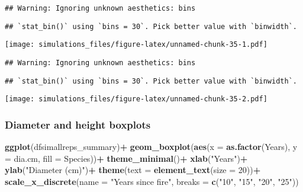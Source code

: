 \documentclass[]{article}
\newenvironment{Shaded}{\begin{snugshade}}{\end{snugshade}}
\newcommand{\KeywordTok}[1]{\textcolor[rgb]{0.13,0.29,0.53}{\textbf{#1}}}
\newcommand{\DataTypeTok}[1]{\textcolor[rgb]{0.13,0.29,0.53}{#1}}
\newcommand{\DecValTok}[1]{\textcolor[rgb]{0.00,0.00,0.81}{#1}}
\newcommand{\StringTok}[1]{\textcolor[rgb]{0.31,0.60,0.02}{#1}}
\newcommand{\OperatorTok}[1]{\textcolor[rgb]{0.81,0.36,0.00}{\textbf{#1}}}
\newcommand{\NormalTok}[1]{#1}
\begin{document}
\begin{verbatim}
## Warning: Ignoring unknown aesthetics: bins
\end{verbatim}

\begin{verbatim}
## `stat_bin()` using `bins = 30`. Pick better value with `binwidth`.
\end{verbatim}

\texttt{[image: simulations\_files/figure-latex/unnamed-chunk-35-1.pdf]}

\begin{Shaded}
\end{Shaded}

\begin{verbatim}
## Warning: Ignoring unknown aesthetics: bins
\end{verbatim}

\begin{verbatim}
## `stat_bin()` using `bins = 30`. Pick better value with `binwidth`.
\end{verbatim}

\texttt{[image: simulations\_files/figure-latex/unnamed-chunk-35-2.pdf]}

\subsubsection{Diameter and height
boxplots}\label{diameter-and-height-boxplots-1}

\begin{Shaded}
\begin{Highlighting}[]
\KeywordTok{ggplot}\NormalTok{(dfsimallreps_summary)}\OperatorTok{+}
\StringTok{  }\KeywordTok{geom_boxplot}\NormalTok{(}\KeywordTok{aes}\NormalTok{(}\DataTypeTok{x =} \KeywordTok{as.factor}\NormalTok{(Years), }\DataTypeTok{y =}\NormalTok{ dia.cm, }\DataTypeTok{fill =}\NormalTok{ Species))}\OperatorTok{+}
\StringTok{  }\KeywordTok{theme_minimal}\NormalTok{()}\OperatorTok{+}
\StringTok{  }\KeywordTok{xlab}\NormalTok{(}\StringTok{"Years"}\NormalTok{)}\OperatorTok{+}
\StringTok{  }\KeywordTok{ylab}\NormalTok{(}\StringTok{"Diameter (cm)"}\NormalTok{)}\OperatorTok{+}
\StringTok{  }\KeywordTok{theme}\NormalTok{(}\DataTypeTok{text =} \KeywordTok{element_text}\NormalTok{(}\DataTypeTok{size =} \DecValTok{20}\NormalTok{))}\OperatorTok{+}
\StringTok{  }\KeywordTok{scale_x_discrete}\NormalTok{(}\DataTypeTok{name =} \StringTok{"Years since fire"}\NormalTok{, }\DataTypeTok{breaks =} \KeywordTok{c}\NormalTok{(}\StringTok{"10"}\NormalTok{, }\StringTok{"15"}\NormalTok{, }\StringTok{"20"}\NormalTok{, }\StringTok{"25"}\NormalTok{))}
\end{Highlighting}
\end{Shaded}
\end{document}
